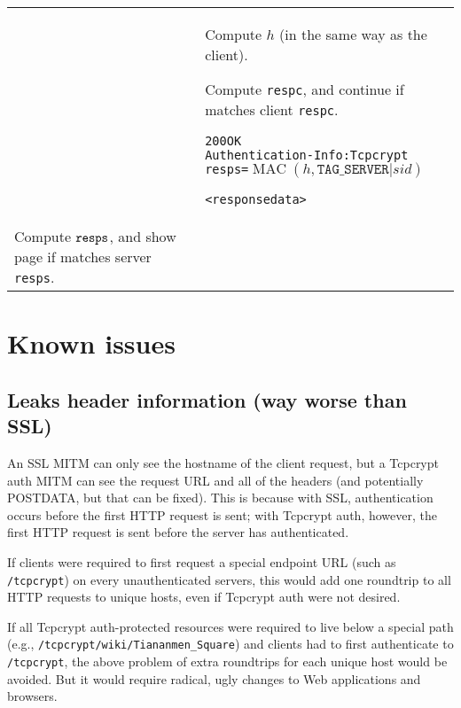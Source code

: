 \documentclass[11pt]{article}
\begin{document}
\begin{tabular}{p{8.9cm} | p{8.9cm}}
&
Compute $h$ (in the same way as the client).

Compute {\tt respc}, and continue if matches client {\tt respc}.

\begin{alltt}
200 OK
Authentication-Info: Tcpcrypt 
                     resps=\(\operatorname{MAC}(h,\texttt{TAG\_SERVER}|sid)\)

<response data>
\end{alltt} \\

Compute ${\tt resps}$, and show page if matches server {\tt resps}. \\

\hline
\end{tabular}


\pagebreak

\section{Known issues}

\subsection{Leaks header information (way worse than SSL)}
An SSL MITM can only see the hostname of the client request, but a Tcpcrypt auth MITM can see the request URL and all of the headers (and potentially POSTDATA, but that can be fixed). This is because with SSL, authentication occurs before the first HTTP request is sent; with Tcpcrypt auth, however, the first HTTP request is sent before the server has authenticated.

If clients were required to first request a special endpoint URL (such as {\tt /tcpcrypt}) on every unauthenticated servers, this would add one roundtrip to all HTTP requests to unique hosts, even if Tcpcrypt auth were not desired.

If all Tcpcrypt auth-protected resources were required to live below a special path \\
 (e.g., {\tt /tcpcrypt/wiki/Tiananmen\_Square}) and clients had to first authenticate to {\tt /tcpcrypt}, the above problem of extra roundtrips for each unique host would be avoided. But it would require radical, ugly changes to Web applications and browsers.
\end{document}
